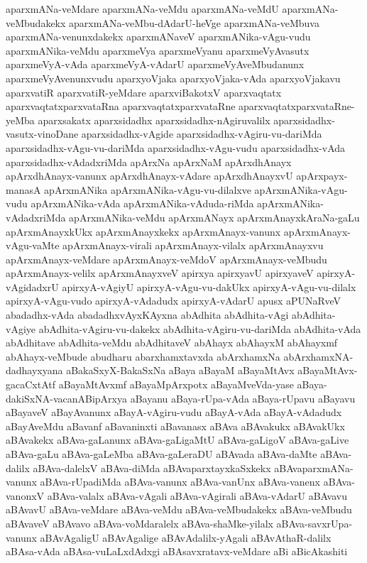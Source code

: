 {aparxmANa-veMdare
aparxmANa-veMdu
aparxmANa-veMdU
aparxmANa-veMbudakekx
aparxmANa-veMbu-dAdarU-heVge
aparxmANa-veMbuva
aparxmANa-venunxdakekx
aparxmANaveV
aparxmANika-vAgu-vudu
aparxmANika-veMdu
aparxmeVya
aparxmeVyanu
aparxmeVyAvasutx
aparxmeVyA-vAda
aparxmeVyA-vAdarU
aparxmeVyAveMbudanunx
aparxmeVyAvenunxvudu
aparxyoVjaka
aparxyoVjaka-vAda
aparxyoVjakavu
aparxvatiR
aparxvatiR-yeMdare
aparxviBakotxV
aparxvaqtatx
aparxvaqtatxparxvataRna
aparxvaqtatxparxvataRne
aparxvaqtatxparxvataRne-yeMba
aparxsakatx
aparxsidadhx
aparxsidadhx-nAgiruvalilx
aparxsidadhx-vasutx-vinoDane
aparxsidadhx-vAgide
aparxsidadhx-vAgiru-vu-dariMda
aparxsidadhx-vAgu-vu-dariMda
aparxsidadhx-vAgu-vudu
aparxsidadhx-vAda
aparxsidadhx-vAdadxriMda
apArxNa
apArxNaM
apArxdhAnayx
apArxdhAnayx-vanunx
apArxdhAnayx-vAdare
apArxdhAnayxvU
apArxpayx-manasA
apArxmANika
apArxmANika-vAgu-vu-dilalxve
apArxmANika-vAgu-vudu
apArxmANika-vAda
apArxmANika-vAduda-riMda
apArxmANika-vAdadxriMda
apArxmANika-veMdu
apArxmANayx
apArxmAnayxkAraNa-gaLu
apArxmAnayxkUkx
apArxmAnayxkekx
apArxmAnayx-vanunx
apArxmAnayx-vAgu-vaMte
apArxmAnayx-virali
apArxmAnayx-vilalx
apArxmAnayxvu
apArxmAnayx-veMdare
apArxmAnayx-veMdoV
apArxmAnayx-veMbudu
apArxmAnayx-velilx
apArxmAnayxveV
apirxya
apirxyavU
apirxyaveV
apirxyA-vAgidadxrU
apirxyA-vAgiyU
apirxyA-vAgu-vu-dakUkx
apirxyA-vAgu-vu-dilalx
apirxyA-vAgu-vudo
apirxyA-vAdadudx
apirxyA-vAdarU
apusx
aPUNaRveV
abadadhx-vAda
abadadhxvAyxKAyxna
abAdhita
abAdhita-vAgi
abAdhita-vAgiye
abAdhita-vAgiru-vu-dakekx
abAdhita-vAgiru-vu-dariMda
abAdhita-vAda
abAdhitave
abAdhita-veMdu
abAdhitaveV
abAhayx
abAhayxM
abAhayxmf
abAhayx-veMbude
abudharu
abarxhamxtavxda
abArxhamxNa
abArxhamxNA-dadhayxyana
aBakaSxyX-BakaSxNa
aBaya
aBayaM
aBayaMtAvx
aBayaMtAvx-gacaCxtAtf
aBayaMtAvxmf
aBayaMpArxpotx
aBayaMveVda-yase
aBaya-dakiSxNA-vacanABipArxya
aBayanu
aBaya-rUpa-vAda
aBaya-rUpavu
aBayavu
aBayaveV
aBayAvanunx
aBayA-vAgiru-vudu
aBayA-vAda
aBayA-vAdadudx
aBayAveMdu
aBavanf
aBavaninxti
aBavanasx
aBAva
aBAvakukx
aBAvakUkx
aBAvakekx
aBAva-gaLanunx
aBAva-gaLigaMtU
aBAva-gaLigoV
aBAva-gaLive
aBAva-gaLu
aBAva-gaLeMba
aBAva-gaLeraDU
aBAvada
aBAva-daMte
aBAva-dalilx
aBAva-dalelxV
aBAva-diMda
aBAvaparxtayxkaSxkekx
aBAvaparxmANa-vanunx
aBAva-rUpadiMda
aBAva-vanunx
aBAva-vanUnx
aBAva-vanenx
aBAva-vanonxV
aBAva-valalx
aBAva-vAgali
aBAva-vAgirali
aBAva-vAdarU
aBAvavu
aBAvavU
aBAva-veMdare
aBAva-veMdu
aBAva-veMbudakekx
aBAva-veMbudu
aBAvaveV
aBAvavo
aBAva-voMdaralelx
aBAva-shaMke-yilalx
aBAva-savxrUpa-vanunx
aBAvAgaligU
aBAvAgalige
aBAvAdalilx-yAgali
aBAvAthaR-dalilx
aBAsa-vAda
aBAsa-vuLaLxdAdxgi
aBAsavxratavx-veMdare
aBi
aBicAkashiti
}

